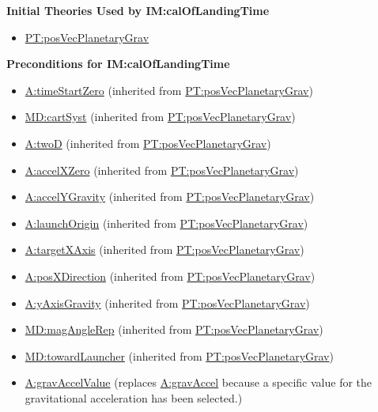 \documentclass[12pt]{article}
\begin{document}
\noindent \textbf{Initial Theories Used by IM:calOfLandingTime}

\begin{itemize}
\item \hyperref[PT:posVecPlanetaryGrav]{PT:posVecPlanetaryGrav}
\end{itemize}

\noindent \textbf{Preconditions for IM:calOfLandingTime}
\begin{itemize}
\item \hyperref[timeStartZero]{A:timeStartZero} (inherited from \hyperref[PT:posVecPlanetaryGrav]{PT:posVecPlanetaryGrav})
\item \hyperref[MD:cartSyst]{MD:cartSyst} (inherited from \hyperref[PT:posVecPlanetaryGrav]{PT:posVecPlanetaryGrav})
\item \hyperref[twoD]{A:twoD} (inherited from \hyperref[PT:posVecPlanetaryGrav]{PT:posVecPlanetaryGrav})
\item \hyperref[accelXZero]{A:accelXZero} (inherited from \hyperref[PT:posVecPlanetaryGrav]{PT:posVecPlanetaryGrav})
\item \hyperref[accelYGravity]{A:accelYGravity} (inherited from \hyperref[PT:posVecPlanetaryGrav]{PT:posVecPlanetaryGrav})
\item \hyperref[launchOrigin]{A:launchOrigin} (inherited from \hyperref[PT:posVecPlanetaryGrav]{PT:posVecPlanetaryGrav})
\item \hyperref[targetXAxis]{A:targetXAxis} (inherited from \hyperref[PT:posVecPlanetaryGrav]{PT:posVecPlanetaryGrav})
\item \hyperref[posXDirection]{A:posXDirection} (inherited from \hyperref[PT:posVecPlanetaryGrav]{PT:posVecPlanetaryGrav})
\item \hyperref[yAxisGravity]{A:yAxisGravity} (inherited from \hyperref[PT:posVecPlanetaryGrav]{PT:posVecPlanetaryGrav})
\item \hyperref[MD:magAngleRep]{MD:magAngleRep} (inherited from \hyperref[PT:posVecPlanetaryGrav]{PT:posVecPlanetaryGrav})
\item \hyperref[MD:towardLauncher]{MD:towardLauncher} (inherited from \hyperref[PT:posVecPlanetaryGrav]{PT:posVecPlanetaryGrav})

\item \hyperref[gravAccelValue]{A:gravAccelValue} (replaces
\hyperref[gravAccel]{A:gravAccel} because a specific value for the gravitational
acceleration has been selected.)

\end{itemize}
\end{document}
